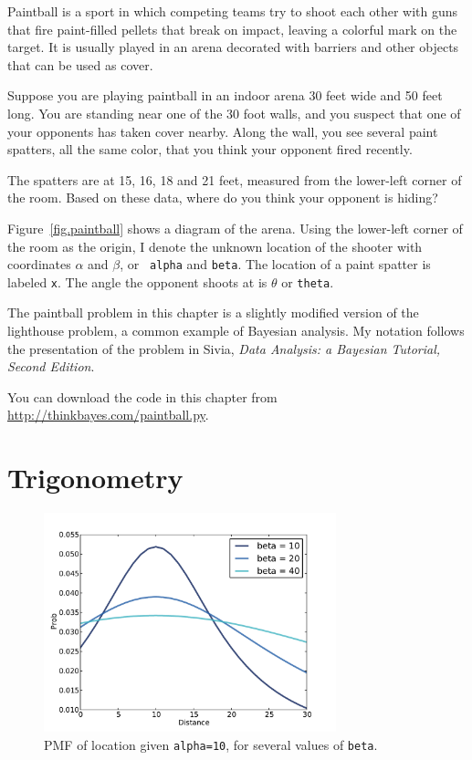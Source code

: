 \documentclass[12pt]{book}
\begin{document}
Paintball is a sport in which competing teams try to shoot each other
with guns that fire paint-filled pellets that break on impact, leaving
a colorful mark on the target.  It is usually played in an
arena decorated with barriers and other objects that can be
used as cover.

Suppose you are playing paintball in an indoor arena 30 feet
wide and 50 feet long.  You are standing near one of the 30 foot
walls, and you suspect that one of your opponents has taken cover
nearby.  Along the wall, you see several paint spatters, all the same
color, that you think your opponent fired recently.

The spatters are at 15, 16, 18 and 21 feet, measured from the
lower-left corner of the room.  Based on these data, where do you
think your opponent is hiding?

Figure~\ref{fig.paintball} shows a diagram of the arena.  Using the
lower-left corner of the room as the origin, I denote the unknown
location of the shooter with coordinates $\alpha$ and $\beta$, or {\tt
  alpha} and {\tt beta}.  The location of a paint spatter is labeled
{\tt x}.  The angle the opponent shoots at is $\theta$ or {\tt theta}.

The paintball problem in this chapter is a slightly modified version
of the lighthouse problem, a common example of Bayesian analysis.  My
notation follows the presentation of the problem in Sivia, {\it Data
  Analysis: a Bayesian Tutorial, Second Edition}.

You can download the code in this chapter from
\url{http://thinkbayes.com/paintball.py}.

\section{Trigonometry}

\begin{figure}
\centerline{\includegraphics[height=2.5in]{figs/paintball1.pdf}}
\caption{PMF of location given {\tt alpha=10}, for several values of
  {\tt beta}.}
\label{fig.paintball1}
\end{figure}
\end{document}
